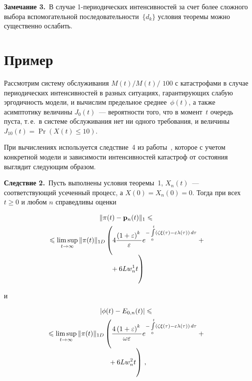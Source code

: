 \begin{multicols}{2}
\bigskip
\noindent
\textbf{Замечание 3.}\
В случае 1-периодических интенсивностей за счет более сложного выбора вспомогательной последовательности~$\{ d_k\}$
условия теоремы можно существенно ослабить.


\section{Пример}

Рассмотрим систему обслуживания $M(t)/ M(t)/$ $100$ с катастрофами в случае периодических интенсивностей
в разных ситуациях, гарантиру\-ющих слабую эргодичность модели, и вычислим предельное среднее~$\phi(t)$, а также асимптотику величины
$J_0(t)$~--- вероятности того, что в момент~$t$ очередь пуста, т.\,е.\
в сис\-те\-ме обслуживания нет ни одного требования, и величины $J_{10}(t)= \Pr\left(X(t) \le 10\right)$.


При вычислениях используется следствие~4 из работы~\cite{z09}, которое с учетом конкретной модели
и зависимости интенсивностей катастроф от состояния выглядит следующим образом.


\medskip

\noindent
\textbf{Следствие 2.}\
Пусть выполнены условия теоремы~1, $X_n(t)$~--- соответствующий усеченный процесс,   а $X(0) = X_n (0) =0.$
Тогда при всех  $t \ge 0$ и любом $n$ справедливы оценки

\noindent
\begin{multline*}
\|{\bf \pi}(t) - {\bf p}_n (t)\|_{1} \le{}\\
 {}\le \limsup_{t \to \infty} \|{\bf \pi} (t)\|_{1D} \left(
4\fr{\left(1+\varepsilon\right)^k}{\varepsilon} e^{-\int\limits_0^t
\left(\zeta\xi(\tau) - \varepsilon \lambda(\tau)\right)\, d\tau} +{}\right.\\[-6pt]
\left.{}\vphantom{e^{-\int\limits_0^t
(\zeta\xi(\tau))}} + 6Lw_n^1 t\right)
\end{multline*}
\vspace*{-6pt}

\noindent
и
\vspace*{-6pt}

\noindent
\begin{multline*}
\left|\phi(t) - E_{0,n}(t)\right| \le{}\\
\!{}\le \limsup_{t \to \infty} \|{\bf \pi} (t)\|_{1D}
\left(\fr{4\left(1+\varepsilon\right)^k}{\omega \varepsilon } e^{-\int\limits_0^t
\left(\zeta\xi(\tau) - \varepsilon \lambda(\tau)\right)\, d\tau} +{}\right.\\[-6pt]
\left.{}\vphantom{e^{-\int\limits_0^t
(\zeta\xi(\tau))}}+ 6Lw_n^2 t\right)\,,
\end{multline*}
\vspace*{-6pt}


\end{multicols}
